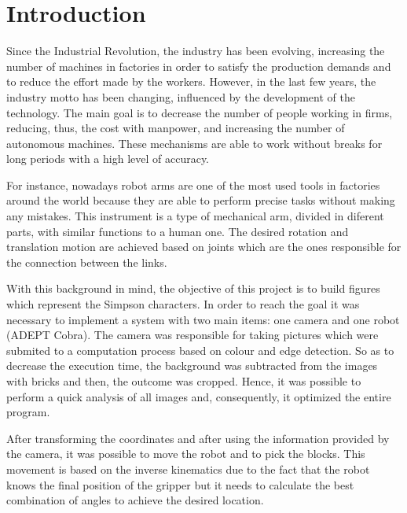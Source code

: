 \chapter{Introduction}\label{ch:introduction}

Since the Industrial Revolution, the industry has been evolving, increasing the number of machines in factories in order to satisfy the production demands and to reduce the effort made by the workers. However, in the last few years, the industry motto has been changing, influenced by the development of the technology. The main goal is to decrease the number of people working in firms, reducing, thus, the cost with manpower, and increasing the number of autonomous machines. These mechanisms are able to work without breaks for long periods with a high level of accuracy. 

For instance, nowadays robot arms are one of the most used tools in factories around the world because they are able to perform precise tasks without making any mistakes. This instrument is a type of mechanical arm, divided in diferent parts, with similar functions to a human one. The desired rotation and translation motion are achieved based on joints which are the ones responsible for the connection between the links. 

With this background in mind, the objective of this project is to build figures which represent the Simpson characters. In order to reach the goal it was necessary to implement a system with two main items: one camera and one robot (ADEPT Cobra). The camera was responsible for taking pictures which were submited to a computation process based on colour and edge detection. So as to decrease the execution time, the background was subtracted from the images with bricks and then, the outcome was cropped. Hence, it was possible to perform a quick analysis of all images and, consequently, it optimized the entire program.

After transforming the coordinates and after using the information provided by the camera, it was possible to move the robot and to pick the blocks. This movement is based on the inverse kinematics due to the fact that the robot knows the final position of the gripper but it needs to calculate the best combination of angles to achieve the desired location.
